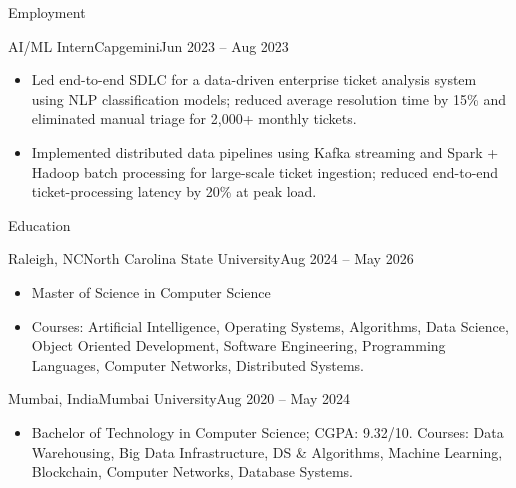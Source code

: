 \documentclass[]{mcdowellcv}
\begin{document}
\begin{cvsection}{Employment}
  \begin{cvsubsection}{AI/ML Intern}{Capgemini}{Jun 2023 -- Aug 2023}
    \begin{itemize}
      \item Led end-to-end SDLC for a data-driven enterprise ticket analysis system using NLP classification models; reduced average resolution time by 15\% and eliminated manual triage for 2,000+ monthly tickets.
      \item Implemented distributed data pipelines using Kafka streaming and Spark + Hadoop batch processing for large-scale ticket ingestion; reduced end-to-end ticket-processing latency by 20\% at peak load.
    \end{itemize}
    \vspace{-1.5pt}
  \end{cvsubsection}
\end{cvsection}

\begin{cvsection}{Education}
  \begin{cvsubsection}{Raleigh, NC}{North Carolina State University}{Aug 2024 -- May 2026}
    \begin{itemize}
      \item Master of Science in Computer Science
      \item Courses: Artificial Intelligence, Operating Systems, Algorithms, Data Science, Object Oriented Development, Software Engineering, Programming Languages, Computer Networks, Distributed Systems.
    \end{itemize}
    \vspace{-1.5pt}
  \end{cvsubsection}

  \begin{cvsubsection}{Mumbai, India}{Mumbai University}{Aug 2020 -- May 2024}
    \begin{itemize}
      \item Bachelor of Technology in Computer Science; CGPA: 9.32/10. Courses: Data Warehousing, Big Data Infrastructure, DS \& Algorithms, Machine Learning, Blockchain, Computer Networks, Database Systems.
    \end{itemize}
    \vspace{-1.5pt}
  \end{cvsubsection}
\end{cvsection}
\end{document}
